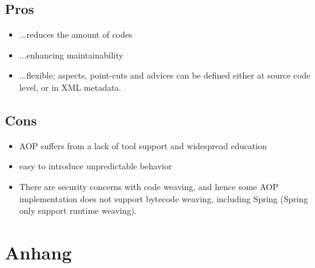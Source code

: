 \documentclass[10pt]{scrartcl}
\begin{document}
\subsection{Pros}
\begin{itemize}
	\item $...$reduces the amount of codes
	\item  $...$enhancing maintainability
	\item $...$flexible; aspects, point-cuts and advices can be defined either at source code level, or in XML metadata.
\end{itemize}

\subsection{Cons}
\begin{itemize}
	 \item AOP suffers from a lack of tool support and widespread education
	 \item easy to introduce unpredictable behavior
	 \item There are security concerns with code weaving, and hence some AOP implementation does not support bytecode weaving, including Spring (Spring only support runtime weaving).
\end{itemize}


\section{Anhang}


\end{document}
